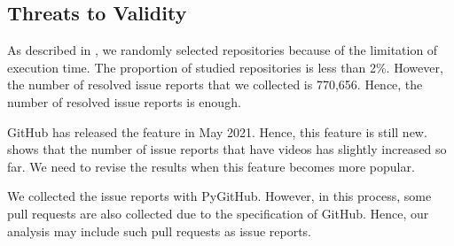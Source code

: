 \subsection{Threats to Validity}
\label{sec:limitation}

As described in , we randomly selected 
repositories because of the limitation of execution time. 
The proportion of studied repositories is less than 2\%. 
However, the number of resolved issue reports that 
we collected is 770,656. 
Hence, the number of resolved issue reports is enough. 

GitHub has released the feature in May 2021. 
Hence, this feature is still new. 
 shows that the number of 
issue reports that have videos has slightly increased so far.
We need to revise the results when this feature becomes more popular. 

We collected the issue reports with PyGitHub. 
However, in this process, some pull requests 
are also collected due to the specification of GitHub. 
Hence, our analysis may include such pull requests as issue reports. 